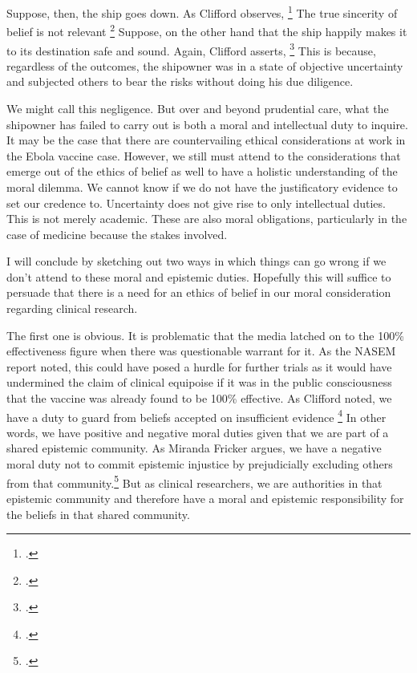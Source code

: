 \documentclass[letterpaper,notitlepage,12pt]{article}
\begin{document}
Suppose, then, the ship goes down.
As Clifford observes, \footcite[p. 339]{clifford}
The true sincerity of belief is not relevant \footcite[p. 340]
  {clifford}
Suppose, on the other hand that the ship happily makes it to its destination
safe and sound.
Again, Clifford asserts, \footcite[p. 340]{clifford}
This is because, regardless of the outcomes, the shipowner was in a state of
objective uncertainty and subjected others to bear the risks without
doing his due diligence.

We might call this negligence.
But over and beyond prudential care, what the shipowner has failed to carry out
is both a moral and intellectual duty to inquire.
It may be the case that there are countervailing ethical considerations at work
in the Ebola vaccine case.
However, we still must attend to the considerations that emerge out of the
ethics of belief as well to have a holistic understanding of the moral dilemma.
We cannot know if we do not have the justificatory evidence to set our credence
to.
Uncertainty does not give rise to only intellectual duties.
This is not merely academic.
These are also moral obligations, particularly in the case of medicine because
the stakes involved.

I will conclude by sketching out two ways in which things can go wrong if we
don't attend to these moral and epistemic duties.
Hopefully this will suffice to persuade that there is a need for an ethics of
belief in our moral consideration regarding clinical research.

The first one is obvious.
It is problematic that the media latched on to the 100\% effectiveness figure when
there was questionable warrant for it.
As the NASEM report noted, this could have posed a hurdle for further
trials as it would have undermined the claim of clinical equipoise if it was in
the public consciousness that the vaccine was already found to be 100\%
effective.
As Clifford noted, we have a duty to guard from beliefs accepted on insufficient
evidence \footcite[344]{clifford}
In other words, we have positive and negative moral duties given that we are
part of a shared epistemic community.
As Miranda Fricker argues, we have a negative moral duty not to commit epistemic
injustice by prejudicially excluding others from that
community.\footcite{fricker}
But as clinical researchers, we are authorities in that epistemic community and
therefore have a moral and epistemic responsibility for the beliefs in that
shared community.
\end{document}

